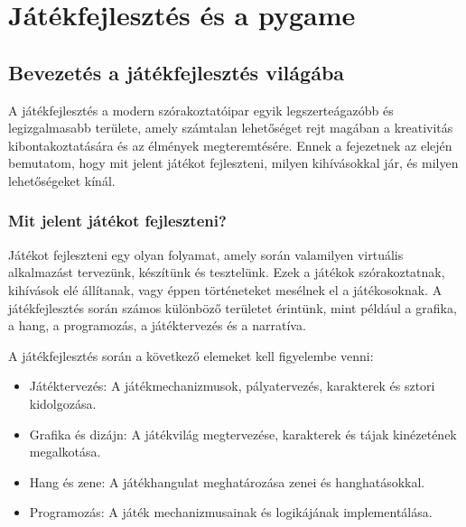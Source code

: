 \chapter{Játékfejlesztés és a pygame}

\section{Bevezetés a játékfejlesztés világába}

 A játékfejlesztés a modern szórakoztatóipar egyik legszerteágazóbb és legizgalmasabb területe, amely számtalan lehetőséget rejt magában a kreativitás kibontakoztatására és az élmények megteremtésére. Ennek a fejezetnek az elején bemutatom, hogy mit jelent játékot fejleszteni, milyen kihívásokkal jár, és milyen lehetőségeket kínál.

\subsection{Mit jelent játékot fejleszteni?}
 Játékot fejleszteni egy olyan folyamat, amely során valamilyen virtuális alkalmazást tervezünk, készítünk és tesztelünk. Ezek a játékok szórakoztatnak, kihívások elé állítanak, vagy éppen történeteket mesélnek el a játékosoknak. A játékfejlesztés során számos különböző területet érintünk, mint például a grafika, a hang, a programozás, a játéktervezés és a narratíva.

A játékfejlesztés során a következő elemeket kell figyelembe venni:

\begin{itemize}
    \item Játéktervezés: A játékmechanizmusok, pályatervezés, karakterek és sztori kidolgozása.
    \item Grafika és dizájn: A játékvilág megtervezése, karakterek és tájak kinézetének megalkotása.
    \item Hang és zene: A játékhangulat meghatározása zenei és hanghatásokkal.
    \item Programozás: A játék mechanizmusainak és logikájának implementálása.
\end{itemize}
